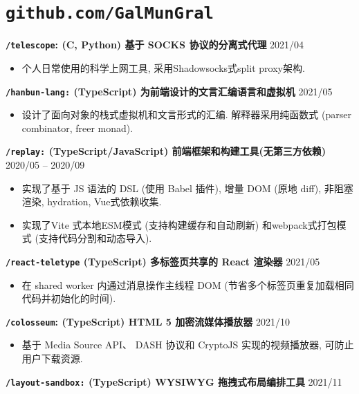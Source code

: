 \documentclass[10pt]{article}
\begin{document}
\section*{\texttt{\large github.com/GalMunGral}}

\textbf{\texttt{/telescope}:  (C, Python) 基于 SOCKS 协议的分离式代理 }   \hfill 2021/04
\begin{itemize}
\item 个人日常使用的科学上网工具, 采用Shadowsocks式split proxy架构.
\end{itemize}

\vspace{0.5em}
\textbf{\texttt{/hanbun-lang:} (TypeScript) 为前端设计的文言汇编语言和虚拟机} \hfill 2021/05
\begin{itemize}
\item 设计了面向对象的栈式虚拟机和文言形式的汇编. 解释器采用纯函数式 (parser combinator, freer monad).
\end{itemize}

\vspace{0.5em}
\textbf{\texttt{/replay:} (TypeScript/JavaScript)  前端框架和构建工具(无第三方依赖) } \hfill 2020/05 -- 2020/09
\begin{itemize}
\item 实现了基于 JS 语法的 DSL (使用 Babel 插件), 增量 DOM (原地 diff), 非阻塞渲染, hydration, Vue式依赖收集.
\item 实现了Vite 式本地ESM模式 (支持构建缓存和自动刷新) 和webpack式打包模式 (支持代码分割和动态导入).
\end{itemize}

\vspace{0.5em}
\textbf{\texttt{/react-teletype}  (TypeScript) 多标签页共享的 React 渲染器} \hfill 2021/05 
\begin{itemize}
\item  在 shared worker 内通过消息操作主线程 DOM (节省多个标签页重复加载相同代码并初始化的时间).
\end{itemize}

\vspace{0.5em}
\textbf{\texttt{/colosseum}:  (TypeScript) HTML 5 加密流媒体播放器}   \hfill 2021/10
\begin{itemize}
\item 基于 Media Source API、 DASH 协议和 CryptoJS 实现的视频播放器, 可防止用户下载资源.
\end{itemize}


\vspace{0.5em}
\textbf{\texttt{/layout-sandbox:} (TypeScript) WYSIWYG 拖拽式布局编排工具} \hfill 2021/11
\end{document}
